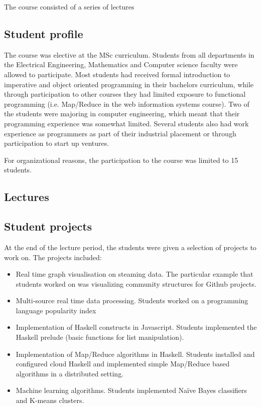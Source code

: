 \documentclass[conference]{IEEEtran}
\begin{document}
The course consisted of a series of lectures 

\subsection{Student profile}

The course was elective at the MSc curriculum. Students from all departments in
the Electrical Engineering, Mathematics and Computer science faculty were
allowed to participate. Most students had received formal introduction to
imperative and object oriented programming in their bachelors curriculum, while
through participation to other courses they had limited exposure to functional
programming (i.e. Map/Reduce in the web information systems course). Two of the
students were majoring in computer engineering, which meant that their
programming experience was somewhat limited. Several students also had work
experience as programmers as part of their industrial placement or through
participation to start up ventures.

For organizational reasons, the participation to the course was limited to 15
students.

\subsection{Lectures}

\subsection{Student projects}

At the end of the lecture period, the students were given a selection of
projects to work on. The projects included:

\begin{itemize}

  \item Real time graph visualisation on steaming data. The
    particular example that students worked on was visualizing community
    structures for Github projects.

  \item Multi-source real time data processing. Students worked on a 
    programming language popularity index 

  \item Implementation of Haskell constructs in Javascript. Students implemented
    the Haskell prelude (basic functions for list manipulation). 

  \item Implementation of Map/Reduce algorithms in Haskell. Students installed
    and configured cloud Haskell and implemented simple Map/Reduce based
    algorithms in a distributed setting.

  \item Machine learning algorithms. Students implemented Na\"ive Bayes 
    classifiers and K-means clusters.

\end{itemize}
\end{document}

